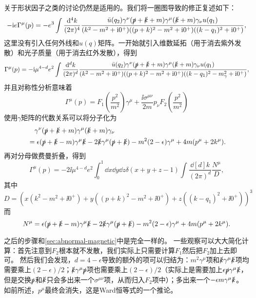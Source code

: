 关于形状因子之类的讨论仍然是适用的。我们将一圈图导致的修正复述如下：
\[
    - \mathrm{i} e \Gamma^\mu(p) = - e^3 \int \frac{\dd[4]{k}}{(2\pi)^4} \frac{\bar{u}(q_2) \gamma^\nu (\slashed{p} + \slashed{k} + m) \gamma^\mu (\slashed{k} + m) \gamma_\nu u(q_1)}{(k^2 - m^2 + \mathrm{i} 0^+) ((p + k)^2 - m^2 + \mathrm{i} 0^+) ((k - q_1)^2 + \mathrm{i} 0^+)} ,
\]
这里没有引入任何外线和$u(q)$矩阵。一开始就引入维数延拓（用于消去紫外发散）和光子质量（用于消去红外发散），得到
\begin{equation}
    \Gamma^\mu(p) = - \mathrm{i} \mu^{4-d} e^2 \int \frac{\dd[d]{k}}{(2\pi)^d} \frac{\bar{u}(q_2) \gamma^\nu (\slashed{p} + \slashed{k} + m) \gamma^\mu (\slashed{k} + m) \gamma_\nu u(q_1)}{(k^2 - m^2 + \mathrm{i} 0^+) ((p + k)^2 - m^2 + \mathrm{i} 0^+) ((k - q_1)^2 - m_\gamma^2 + \mathrm{i} 0^+)} ,
\end{equation}
并且对称性分析意味着
\begin{equation}
    \Gamma^\mu(p) = F_1\left(\frac{p^2}{m^2}\right) \gamma^\mu + \frac{\ii \sigma^{\mu \nu}}{2m} p_\nu F_2\left(\frac{p^2}{m^2}\right)
\end{equation}
使用$\gamma$矩阵的代数关系可以将分子化为
\[
    \begin{aligned}
        &\quad \gamma^\nu (\slashed{p} + \slashed{k} + m) \gamma^\mu (\slashed{k} + m) \gamma_\nu \\
        &= \epsilon (\slashed{p} + \slashed{k} - m) \gamma^\mu \slashed{k} - 2 \slashed{k} \gamma^\mu (\slashed{p} + \slashed{k}) - m^2 (2 - \epsilon) \gamma^\mu + 4m (p^\mu + 2 k^\mu).
    \end{aligned}
\]
再对分母做费曼折叠，得到
\begin{equation}
    \Gamma^\mu(p) = - 2 \ii \mu^{4-d} e^2 \int_0^1 \dd{x} \dd{y} \dd{z} \delta(x + y + z - 1) \int \frac{\dd[d]{k}}{(2\pi)^d} \frac{N^\mu}{D},
\end{equation}
其中
\begin{equation}
    D = (x (k^2 - m^2 + \ii 0^+) + y ((p + k)^2 - m^2 + \ii 0^+) + z ((k - q_1)^2 + \ii 0^+))^3
\end{equation}
而
\begin{equation}
    N^\mu = \epsilon (\slashed{p} + \slashed{k} - m) \gamma^\mu \slashed{k} - 2 \slashed{k} \gamma^\mu (\slashed{p} + \slashed{k}) - m^2 (2 - \epsilon) \gamma^\mu + 4m (p^\mu + 2 k^\mu).
\end{equation}

之后的步骤和\autoref{sec:abnormal-magnetic}中是完全一样的。
一些观察可以大大简化计算：首先注意到$F_2$根本就不发散，我们实际上只需要计算$F_1$然后把$F_2$加上去即可。
然后我们会发现，$d=4-\epsilon$导致的额外的项可以归结为：$m^2 \gamma^\mu$项和$\slashed{k} \gamma^\mu \slashed{k}$项均需要乘上$(2-\epsilon) / 2$；$\slashed{k} \gamma^\mu \slashed{p}$项也需要乘上$(2 - \epsilon) / 2$（实际上是需要加上$\epsilon \slashed{p} \gamma^\mu \slashed{k}$，但是交换$\slashed{p}$和$\slashed{k}$只会多出来一个$\sigma^{\mu \nu}$项，从而归入$F_2$项中）；多出来一个$- \epsilon m \gamma^\mu \slashed{k}$。
如前所述，$p^\mu$最终会消失，这是Ward恒等式的一个推论。

